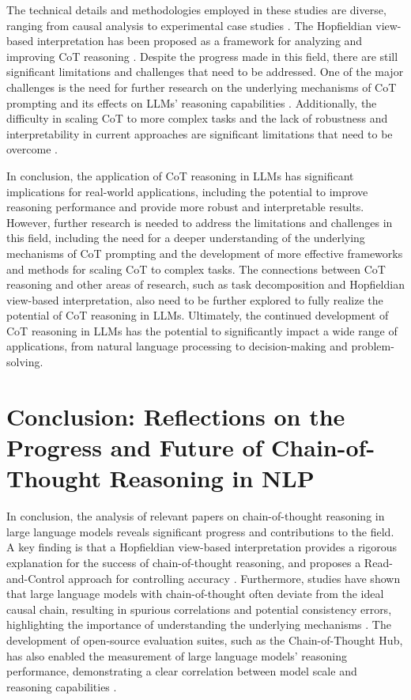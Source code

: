 \documentclass[conference]{IEEEtran}
\begin{document}
The technical details and methodologies employed in these studies are diverse, ranging from causal analysis \cite{b1} to experimental case studies \cite{b2, b5}. The Hopfieldian view-based interpretation has been proposed as a framework for analyzing and improving CoT reasoning \cite{b3, b4}. Despite the progress made in this field, there are still significant limitations and challenges that need to be addressed. One of the major challenges is the need for further research on the underlying mechanisms of CoT prompting and its effects on LLMs' reasoning capabilities \cite{b1, b2}. Additionally, the difficulty in scaling CoT to more complex tasks and the lack of robustness and interpretability in current approaches are significant limitations that need to be overcome \cite{b5}.

In conclusion, the application of CoT reasoning in LLMs has significant implications for real-world applications, including the potential to improve reasoning performance and provide more robust and interpretable results. However, further research is needed to address the limitations and challenges in this field, including the need for a deeper understanding of the underlying mechanisms of CoT prompting and the development of more effective frameworks and methods for scaling CoT to complex tasks. The connections between CoT reasoning and other areas of research, such as task decomposition and Hopfieldian view-based interpretation, also need to be further explored to fully realize the potential of CoT reasoning in LLMs. Ultimately, the continued development of CoT reasoning in LLMs has the potential to significantly impact a wide range of applications, from natural language processing to decision-making and problem-solving.

\section{Conclusion: Reflections on the Progress and Future of Chain-of-Thought Reasoning in NLP}
In conclusion, the analysis of relevant papers on chain-of-thought reasoning in large language models reveals significant progress and contributions to the field. A key finding is that a Hopfieldian view-based interpretation provides a rigorous explanation for the success of chain-of-thought reasoning, and proposes a Read-and-Control approach for controlling accuracy \cite{b1}. Furthermore, studies have shown that large language models with chain-of-thought often deviate from the ideal causal chain, resulting in spurious correlations and potential consistency errors, highlighting the importance of understanding the underlying mechanisms \cite{b2}. The development of open-source evaluation suites, such as the Chain-of-Thought Hub, has also enabled the measurement of large language models' reasoning performance, demonstrating a clear correlation between model scale and reasoning capabilities \cite{b3}.
\end{document}
